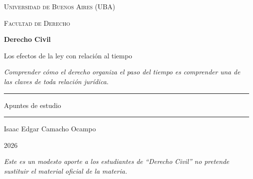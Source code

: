 \documentclass[12pt,oneside]{book}
\newcommand{\universidad}{Universidad de Buenos Aires (UBA)}
\newcommand{\facultad}{Facultad de Derecho}
\newcommand{\materiaabrev}{Derecho Civil}
\newcommand{\titulo}{Los efectos de la ley con relación al tiempo}
\newcommand{\autor}{Isaac Edgar Camacho Ocampo}
\newcommand{\anio}{2026}
\begin{document}
\begin{titlepage}
\thispagestyle{empty}

\begin{center}

\vspace*{1cm}

{\large \textsc{\universidad}}

\vspace{0.2cm}

{\large \textsc{\facultad}}

\vspace{3cm}

{\Huge \textbf{\materiaabrev}}

\vspace{1cm}

{\LARGE \titulo}

\vspace{0.8cm}

\textit{Comprender cómo el derecho organiza el paso del tiempo es comprender una de las claves de toda relación jurídica.}

\vspace{1.2cm}

\rule{0.70\textwidth}{0.5pt}

\vspace{0.5cm}

{\large Apuntes de estudio}

\vspace{0.5cm}

\rule{0.70\textwidth}{0.5pt}

\vfill

{\large \autor}

\vspace{0.3cm}

{\large \anio}

\end{center}

\vfill

\begin{flushleft}
\textit{Este es un modesto aporte a los estudiantes de ``\materiaabrev'' no pretende sustituir el material oficial de la materia.}
\end{flushleft}

\end{titlepage}

\tableofcontents

\end{document}
